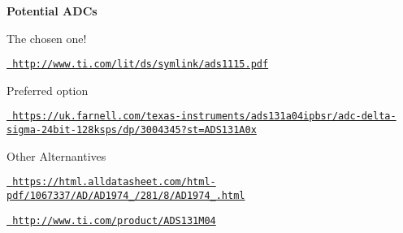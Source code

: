 {\bfseries{Potential A\+DC\textquotesingle{}s}}

The chosen one!

\href{http://www.ti.com/lit/ds/symlink/ads1115.pdf}{\texttt{ http\+://www.\+ti.\+com/lit/ds/symlink/ads1115.\+pdf}}

Preferred option

\href{https://uk.farnell.com/texas-instruments/ads131a04ipbsr/adc-delta-sigma-24bit-128ksps/dp/3004345?st=ADS131A0x}{\texttt{ https\+://uk.\+farnell.\+com/texas-\/instruments/ads131a04ipbsr/adc-\/delta-\/sigma-\/24bit-\/128ksps/dp/3004345?st=\+A\+D\+S131\+A0x}}

Other Alternantives

\href{https://html.alldatasheet.com/html-pdf/1067337/AD/AD1974_13/281/8/AD1974_13.html}{\texttt{ https\+://html.\+alldatasheet.\+com/html-\/pdf/1067337/\+A\+D/\+A\+D1974\+\_/281/8/\+A\+D1974\+\_.\+html}}

\href{http://www.ti.com/product/ADS131M04}{\texttt{ http\+://www.\+ti.\+com/product/\+A\+D\+S131\+M04}} 